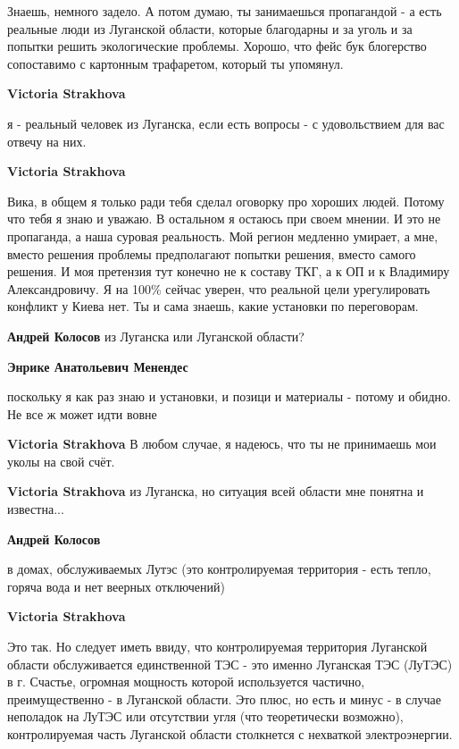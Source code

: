 \begin{itemize}

Знаешь, немного задело. А потом думаю, ты занимаешься пропагандой - а есть
реальные люди из Луганской области, которые благодарны и за уголь и за попытки
решить экологические проблемы. Хорошо, что фейс бук блогерство сопоставимо с
картонным трафаретом, который ты упомянул.

\begin{itemize} %
\textbf{Victoria Strakhova} 

я - реальный человек из Луганска, если есть вопросы - с удовольствием для вас отвечу на них.

\textbf{Victoria Strakhova} 

Вика, в общем я только ради тебя сделал оговорку про хороших людей. Потому что
тебя я знаю и уважаю. В остальном я остаюсь при своем мнении. И это не
пропаганда, а наша суровая реальность. Мой регион медленно умирает, а мне,
вместо решения проблемы предполагают попытки решения, вместо самого решения. И
моя претензия тут конечно не к составу ТКГ, а к ОП и к Владимиру
Александровичу. Я на 100\% сейчас уверен, что реальной цели урегулировать
конфликт у Киева нет. Ты и сама знаешь, какие установки по переговорам.

\textbf{Андрей Колосов} из Луганска или Луганской области?

\textbf{Энрике Анатольевич Менендес} 

поскольку я как раз знаю и установки, и позици и материалы - потому и обидно.
Не все ж может идти вовне

\textbf{Victoria Strakhova} В любом случае, я надеюсь, что ты не принимаешь мои уколы на свой счёт.

\textbf{Victoria Strakhova} из Луганска, но ситуация всей области мне понятна и известна...

\textbf{Андрей Колосов} 

в домах, обслуживаемых Лутэс (это контролируемая территория - есть тепло,
горяча вода и нет веерных отключений)

\textbf{Victoria Strakhova} 

Это так. Но следует иметь ввиду, что контролируемая территория Луганской
области обслуживается единственной ТЭС - это именно Луганская ТЭС (ЛуТЭС) в г.
Счастье, огромная мощность которой используется частично, преимущественно - в
Луганской области. Это плюс, но есть и минус - в случае неполадок на ЛуТЭС или
отсутствии угля (что теоретически возможно), контролируемая часть Луганской
области столкнется с нехваткой электроэнергии.


\end{itemize}
\end{itemize}
